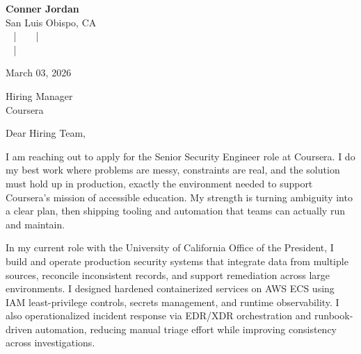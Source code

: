 \documentclass[letterpaper,11pt]{article}
\newcommand{\companyname}{Coursera}
\begin{document}
\begin{center}
  {\Huge \textbf{Conner Jordan}}\\[4pt]
  {\Large San Luis Obispo, CA}\\[4pt]
  \href{tel:+18059759793}{
    } ~ | ~
  \href{mailto:connercharlesjordan@gmail.com}{
    } ~ | ~
   \\
  \href{https://www.linkedin.com/in/conner-jordan-4b268514a/}{
    } ~ | ~
  \href{https://github.com/cjordan223}{
    }
\end{center}

\vspace{16pt}

\begin{flushright}
March 03, 2026
\end{flushright}

Hiring Manager\\
\companyname

\vspace{26pt}

\noindent
Dear Hiring Team,

\vspace{16pt}

I am reaching out to apply for the Senior Security Engineer role at Coursera. I do my best work where problems are messy, constraints are real, and the solution must hold up in production, exactly the environment needed to support Coursera’s mission of accessible education. My strength is turning ambiguity into a clear plan, then shipping tooling and automation that teams can actually run and maintain.

\vspace{16pt}

In my current role with the University of California Office of the President, I build and operate production security systems that integrate data from multiple sources, reconcile inconsistent records, and support remediation across large environments. I designed hardened containerized services on AWS ECS using IAM least-privilege controls, secrets management, and runtime observability. I also operationalized incident response via EDR/XDR orchestration and runbook-driven automation, reducing manual triage effort while improving consistency across investigations.
\end{document}
